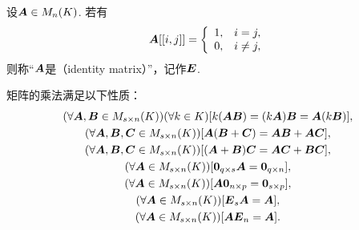 \begin{definition}
设\(\boldsymbol{A}\in M_n(K)\).
若有\begin{equation*}
	\boldsymbol{A}[[i,j]]
	= \left\{ \begin{array}{cl}
		1, & i=j, \\
		0, & i\neq j,
	\end{array} \right.
\end{equation*}
则称“\(\boldsymbol{A}\)是（identity matrix）”，记作\(\boldsymbol{E}\).
\end{definition}

\begin{property}
矩阵的乘法满足以下性质：
\begin{gather}
	(\forall\boldsymbol{A},\boldsymbol{B}\in M_{s\times n}(K))(\forall k\in K)[k(\boldsymbol{A}\boldsymbol{B}) = (k\boldsymbol{A})\boldsymbol{B} = \boldsymbol{A}(k\boldsymbol{B})], \\
	(\forall\boldsymbol{A},\boldsymbol{B},\boldsymbol{C}\in M_{s\times n}(K))[\boldsymbol{A}(\boldsymbol{B}+\boldsymbol{C}) = \boldsymbol{A}\boldsymbol{B} + \boldsymbol{A}\boldsymbol{C}], \label{equation:矩阵的乘法.左分配律} \\
	(\forall\boldsymbol{A},\boldsymbol{B},\boldsymbol{C}\in M_{s\times n}(K))[(\boldsymbol{A}+\boldsymbol{B})\boldsymbol{C} = \boldsymbol{A}\boldsymbol{C} + \boldsymbol{B}\boldsymbol{C}], \label{equation:矩阵的乘法.右分配律} \\
	(\forall\boldsymbol{A}\in M_{s\times n}(K))[\boldsymbol0_{q \times s} \boldsymbol{A} = \boldsymbol0_{q \times n}], \\
	(\forall\boldsymbol{A}\in M_{s\times n}(K))[\boldsymbol{A} \boldsymbol0_{n \times p} = \boldsymbol0_{s \times p}], \\
	(\forall\boldsymbol{A}\in M_{s\times n}(K))[\boldsymbol{E}_s \boldsymbol{A} = \boldsymbol{A}], \\
	(\forall\boldsymbol{A}\in M_{s\times n}(K))[\boldsymbol{A} \boldsymbol{E}_n = \boldsymbol{A}].
\end{gather}
\end{property}

